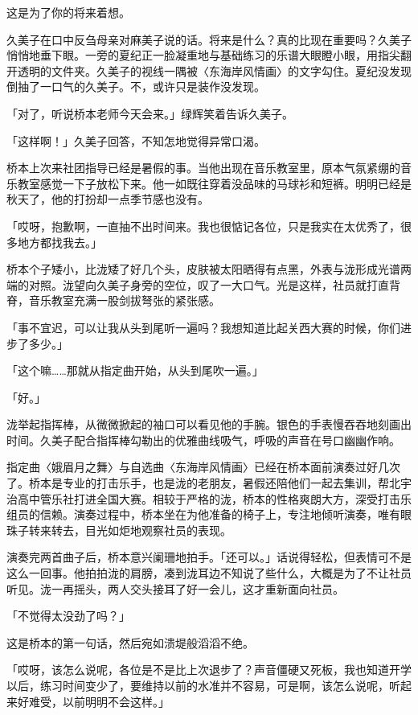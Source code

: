 \documentclass[UTF8]{ctexart}
\begin{document}
    这是为了你的将来着想。 

    久美子在口中反刍母亲对麻美子说的话。将来是什么？真的比现在重要吗？久美子悄悄地垂下眼。一旁的夏纪正一脸凝重地与基础练习的乐谱大眼瞪小眼，用指尖翻开透明的文件夹。久美子的视线一隅被〈东海岸风情画〉的文字勾住。夏纪没发现倒抽了一口气的久美子。不，或许只是装作没发现。 

    「对了，听说桥本老师今天会来。」绿辉笑着告诉久美子。 

    「这样啊！」久美子回答，不知怎地觉得异常口渴。 

    桥本上次来社团指导已经是暑假的事。当他出现在音乐教室里，原本气氛紧绷的音乐教室感觉一下子放松下来。他一如既往穿着没品味的马球衫和短裤。明明已经是秋天了，他的打扮却一点季节感也没有。 

    「哎呀，抱歉啊，一直抽不出时间来。我也很惦记各位，只是我实在太优秀了，很多地方都找我去。」 

    桥本个子矮小，比泷矮了好几个头，皮肤被太阳晒得有点黑，外表与泷形成光谱两端的对照。泷望向久美子身旁的空位，叹了一大口气。光是这样，社员就打直背脊，音乐教室充满一股剑拔弩张的紧张感。 

    「事不宜迟，可以让我从头到尾听一遍吗？我想知道比起关西大赛的时候，你们进步了多少。」 

    「这个嘛……那就从指定曲开始，从头到尾吹一遍。」 

    「好。」 

    泷举起指挥棒，从微微掀起的袖口可以看见他的手腕。银色的手表慢吞吞地刻画出时间。久美子配合指挥棒勾勒出的优雅曲线吸气，呼吸的声音在号口幽幽作响。 

    指定曲〈娥眉月之舞〉与自选曲〈东海岸风情画〉已经在桥本面前演奏过好几次了。桥本是专业的打击乐手，也是泷的老朋友，暑假还陪他们一起去集训，帮北宇治高中管乐社打进全国大赛。相较于严格的泷，桥本的性格爽朗大方，深受打击乐组员的信赖。演奏过程中，桥本坐在为他准备的椅子上，专注地倾听演奏，唯有眼珠子转来转去，目光如炬地观察社员的表现。 

    演奏完两首曲子后，桥本意兴阑珊地拍手。「还可以。」话说得轻松，但表情可不是这么一回事。他拍拍泷的肩膀，凑到泷耳边不知说了些什么，大概是为了不让社员听见。泷一再摇头，两人交头接耳了好一会儿，这才重新面向社员。 

    「不觉得太没劲了吗？」 

    这是桥本的第一句话，然后宛如溃堤般滔滔不绝。 

    「哎呀，该怎么说呢，各位是不是比上次退步了？声音僵硬又死板，我也知道开学以后，练习时间变少了，要维持以前的水准并不容易，可是啊，该怎么说呢，听起来好难受，以前明明不会这样。」 
\end{document}
